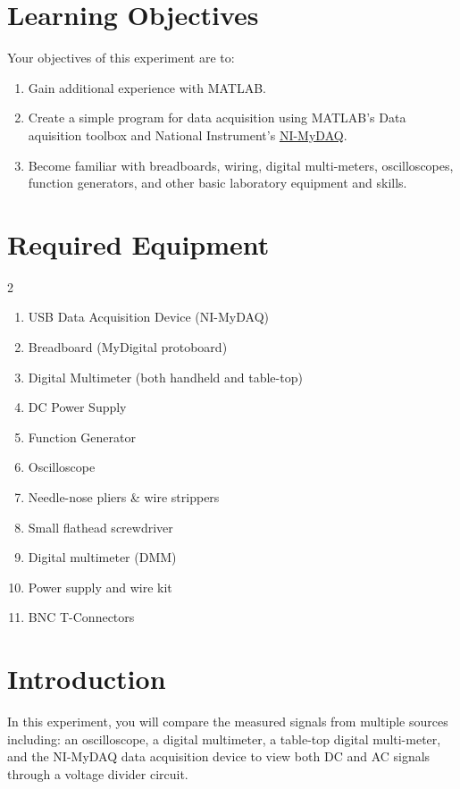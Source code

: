 \documentclass{article} %
\begin{document}


\clearpage

\section{Learning Objectives}
Your objectives of this experiment are to:

\begin{enumerate}
\item Gain additional experience with MATLAB.
\item Create a simple program for data acquisition using MATLAB's Data aquisition toolbox and National Instrument’s \href{https://www.ni.com/docs/en-US/bundle/mydaq-specs/page/specs.html}{NI-MyDAQ}.
\item Become familiar with breadboards, wiring, digital multi-meters, oscilloscopes, function generators, and other basic laboratory equipment and skills.
\end{enumerate}

\section{Required Equipment}
\begin{multicols}{2}
\begin{enumerate}
    \item USB Data Acquisition Device (NI-MyDAQ)
    \item Breadboard (MyDigital protoboard)
    \item Digital Multimeter (both handheld and table-top)
    \item DC Power Supply
    \item Function Generator
    \item Oscilloscope
    \item Needle-nose pliers \& wire strippers
    \item Small flathead screwdriver
    \item Digital multimeter (DMM)
    \item Power supply and wire kit
    \item BNC T-Connectors
\end{enumerate}
\end{multicols}

\section{Introduction}
In this experiment, you will compare the measured signals from multiple sources including: an oscilloscope, a digital multimeter, a table-top digital multi-meter, and the NI-MyDAQ data acquisition device to view both DC and AC signals through a voltage divider circuit. 
\end{document}

